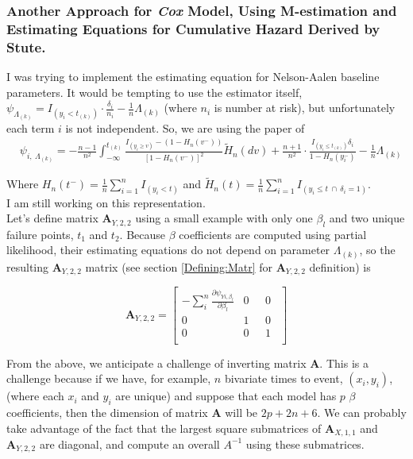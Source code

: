 \documentclass[]{article}
\begin{document}
\subsubsection{Another Approach for \emph{Cox} Model, Using M-estimation and Estimating Equations for Cumulative Hazard Derived by Stute.}
I was trying to implement the estimating equation for Nelson-Aalen baseline parameters. It would be tempting to use the estimator itself, $\psi_{\Lambda_{(k)}} = I_{(y_i < t_{(k)})}\cdot \frac{\delta_i}{n_i} - \frac{1}{n}\Lambda_{(k)}$ (where $n_i$ is number at risk), but unfortunately each term $i$ is not independent. So, we are using the paper of \cite{stute1994strong} 
  $$
  \begin{aligned}
    &\psi_{i,~\Lambda_{(k)}} = -\frac{n-1}{n^2} \int_{-\infty}^{t_{(k)}} \frac{ I_{(y_i \geq v)}  -(1 - H_n(v^-))}{[1 - H_n(v^-)]^2} \tilde{H}_n(dv) + \frac{n+1}{n^2} \cdot \frac{ I_{(y_i \leq t_{(k)}) }\delta_i}{1 - H_n(y_i^-)} - \frac{1}{n} \Lambda_{(k)}
  \end{aligned}
  $$
  
Where $H_n(t^-) = \frac{1}{n}\sum_{i = 1}^n  I_{(y_i < t)}$ and $\tilde{H}_n(t) = \frac{1}{n}\sum_{i = 1}^n  I_{(y_i \leq t ~\cap~ \delta_i = 1)}$.\\

I am still working on this representation.\\

Let's define matrix $\pmb{A}_{Y,2,2}$ using a small example with only one $\beta_l$ and two unique failure points, $t_1$ and $t_2$. Because $\beta$ coefficients are computed using partial likelihood, their estimating equations do not depend on parameter $\Lambda_{(k)}$, so the resulting $\pmb{A}_{Y,2,2}$ matrix (see section \ref{Defining:Matr} for  $\pmb{A}_{Y,2,2}$ definition) is

  \[
  \pmb{A}_{Y,2,2} = \begin{bmatrix}
      -\sum_i^n\frac{\partial \psi_{Yi,\beta_l}}{ \partial \beta_l} & 0 & ~~~0~~ \\
      0 & 1 & ~~~0~~ \\
      0 & 0 & ~~~1~~ \\
  \end{bmatrix}
  \]

From the above, we anticipate a challenge of inverting matrix $\pmb{A}$. This is a challenge because if we have, for example, $n$ bivariate times to event, $(x_i,y_i)$, (where each $x_i$ and $y_i$ are unique) and suppose that each model has $p$ $\beta$ coefficients, then the dimension of matrix $\pmb{A}$ will be $2p + 2n + 6$. We can probably take advantage of the fact that the  largest square submatrices of $\pmb{A}_{X,1,1}$ and $\pmb{A}_{Y,2,2}$ are diagonal, and compute an overall $A^{-1}$ using these submatrices.\\
\end{document}
